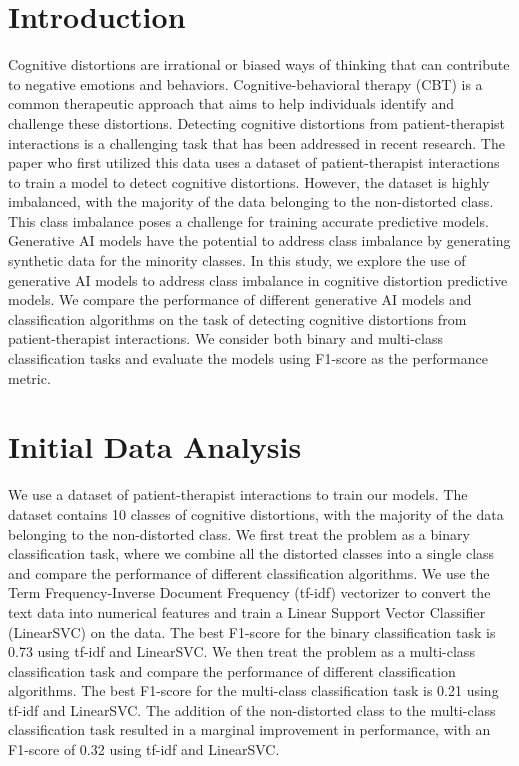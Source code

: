 \documentclass[a0,landscape]{a0poster}
\begin{document}
\begin{multicols}{4}
\color{Teal}

\section*{Introduction}
\color{Black}

Cognitive distortions are irrational or biased ways of thinking that can contribute to negative emotions and behaviors. Cognitive-behavioral therapy (CBT) is a common 
therapeutic approach that aims to help individuals identify and challenge these distortions. Detecting cognitive distortions from patient-therapist interactions is a 
challenging task that has been addressed in recent research. The paper who first utilized this data\cite{original_paper} uses a dataset of patient-therapist interactions to train a 
model to detect cognitive distortions. However, the dataset is highly imbalanced, with the majority of the data belonging to the non-distorted class. This class 
imbalance poses a challenge for training accurate predictive models. Generative AI models have the potential to address class imbalance by generating synthetic data 
for the minority classes. In this study, we explore the use of generative AI models to address class imbalance in cognitive distortion predictive models. We compare 
the performance of different generative AI models and classification algorithms on the task of detecting cognitive distortions from patient-therapist interactions. 
We consider both binary and multi-class classification tasks and evaluate the models using F1-score as the performance metric.

\color{Teal}
\section*{Initial Data Analysis}
\color{Black}

We use a dataset of patient-therapist interactions to train our models. The dataset contains 10 classes of cognitive distortions, with the majority of the data belonging 
to the non-distorted class. We first treat the problem as a binary classification task, where we combine all the distorted classes into a single class and compare the 
performance of different classification algorithms. We use the Term Frequency-Inverse Document Frequency (tf-idf) vectorizer to convert the text data into numerical 
features and train a Linear Support Vector Classifier (LinearSVC) on the data. The best F1-score for the binary classification task is 0.73 using tf-idf and LinearSVC. 
We then treat the problem as a multi-class classification task and compare the performance of different classification algorithms. The best F1-score for the multi-class 
classification task is 0.21 using tf-idf and LinearSVC. The addition of the non-distorted class to the multi-class classification task resulted in a marginal improvement 
in performance, with an F1-score of 0.32 using tf-idf and LinearSVC.


\end{multicols}
\end{document}
